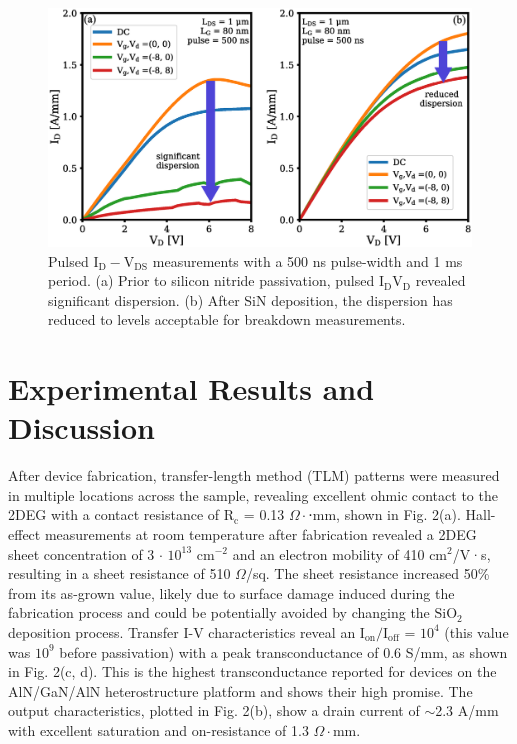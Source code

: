 \documentclass[journal]{IEEEtran}
\begin{document}
\begin{figure}[!b]
\centering
\includegraphics[width=\columnwidth]{Figure3.eps}
\caption{Pulsed $\mathrm{I_D-V_{DS}}$ measurements with a 500 ns pulse-width and 1 ms period. (a) Prior to silicon nitride passivation, pulsed $\mathrm{I_DV_D}$ revealed significant dispersion. (b) After SiN deposition, the dispersion has reduced to levels acceptable for breakdown measurements. }
\label{fig:pulsed}
\end{figure}

\section{Experimental Results and Discussion}
\label{sec:Experimental Results and Discussion}
After device fabrication, transfer-length method (TLM) patterns were measured in multiple locations across the sample, revealing excellent ohmic contact to the 2DEG with a contact resistance of $\mathrm{R_c}$ = 0.13 $\Omega\cdot$⋅mm, shown in Fig. 2(a). Hall-effect measurements at room temperature after fabrication revealed a 2DEG sheet concentration of 3 $\cdot$ $\mathrm{10^{13}}$ $\mathrm{cm^{-2}}$ and an electron mobility of 410 $\mathrm{cm^2}$/V·s, resulting in a sheet resistance of 510 $\Omega$/sq. The sheet resistance increased 50\% from its as-grown value, likely due to surface damage induced during the fabrication process and could be potentially avoided by changing the $\mathrm{SiO_2}$ deposition process. Transfer I-V characteristics reveal an $\mathrm{I_{on}}/\mathrm{I_{off}}$ = $\mathrm{10^4}$ (this value was $\mathrm{10^9}$ before passivation) with a peak transconductance of 0.6 S/mm, as shown in Fig. 2(c, d). This is the highest transconductance reported for devices on the AlN/GaN/AlN heterostructure platform and shows their high promise. The output characteristics, plotted in Fig. 2(b), show a drain current of $\sim$2.3 A/mm with excellent saturation and on-resistance of 1.3 $\Omega\cdot$mm.
\end{document}
